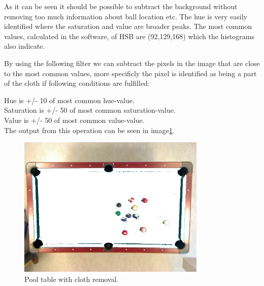 As it can be seen it should be possible to subtract the background without removing too much information about ball location etc. The hue is very easily identified where the saturation and value are broader peaks.
The most common values, calculated in the software, of HSB are (92,129,168) which the histograms also indicate.

By using the following filter we can subtract the pixels in the image that are close to the most common values, more specificly the pixel is identified as being a part of the cloth if following conditions are fulfilled:

Hue is +/- 10 of most common hue-value.\\
Saturation is +/- 50 of most common saturation-value.\\
Value is +/- 50 of most common value-value.\\

The output from this operation can be seen in image\ref{fig:poolclothremoval}.

\begin{figure}[H]
\begin{center}
\leavevmode
\includegraphics[width=0.8\textwidth]{images/table-remove-cloth.jpg}
\end{center}
\caption{Pool table with cloth removal.}
\label{fig:poolclothremoval}
\end{figure}



